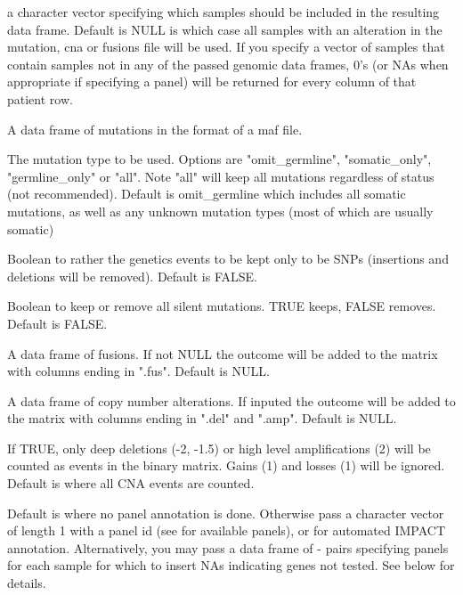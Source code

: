 \documentclass[a4paper]{book}
\begin{document}
\begin{Arguments}
\begin{ldescription}
\item[\code{samples}] a character vector specifying which samples should be included in the resulting data frame.
Default is NULL is which case all samples with an alteration in the mutation, cna or fusions file will be used. If you specify
a vector of samples that contain samples not in any of the passed genomic data frames, 0's (or NAs when appropriate if specifying a panel) will be
returned for every column of that patient row.

\item[\code{mutation}] A data frame of mutations in the format of a maf file.

\item[\code{mut\_type}] The mutation type to be used. Options are "omit\_germline", "somatic\_only", "germline\_only" or "all". Note "all" will
keep all mutations regardless of status (not recommended). Default is omit\_germline which includes all somatic mutations, as well as any unknown mutation types (most of which are usually somatic)

\item[\code{snp\_only}] Boolean to rather the genetics events to be kept only to be SNPs (insertions and deletions will be removed).
Default is FALSE.

\item[\code{include\_silent}] Boolean to keep or remove all silent mutations. TRUE keeps, FALSE removes. Default is FALSE.

\item[\code{fusion}] A data frame of fusions. If not NULL the outcome will be added to the matrix with columns ending in ".fus".
Default is NULL.

\item[\code{cna}] A data frame of copy number alterations. If inputed the outcome will be added to the matrix with columns ending in ".del" and ".amp".
Default is NULL.

\item[\code{high\_level\_cna\_only}] If TRUE, only deep deletions (-2, -1.5) or high level amplifications (2) will be counted as events
in the binary matrix. Gains (1) and losses (1) will be ignored. Default is  where all CNA events are counted.

\item[\code{specify\_panel}] Default is  where no panel annotation is done. Otherwise pass a character vector of length 1 with a
panel id (see  for available panels), or  for automated IMPACT annotation.
Alternatively, you may pass a data frame of - pairs specifying panels for each sample for
which to insert NAs indicating genes not tested. See below for details.


\end{ldescription}
\end{Arguments}
\end{document}
